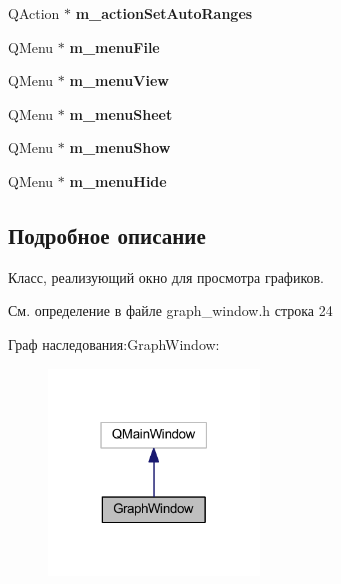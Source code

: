 \begin{DoxyCompactItemize}
\item 
\hypertarget{class_graph_window_add86d9623399b3aaace9c961c2c56d9f}{}\label{class_graph_window_add86d9623399b3aaace9c961c2c56d9f} 
Q\+Action $\ast$ {\bfseries m\+\_\+action\+Set\+Auto\+Ranges}
\item 
\hypertarget{class_graph_window_a2cfe856a0c10dfffb05e4a568d135feb}{}\label{class_graph_window_a2cfe856a0c10dfffb05e4a568d135feb} 
Q\+Menu $\ast$ {\bfseries m\+\_\+menu\+File}
\item 
\hypertarget{class_graph_window_a3e2ffe57452e156a0d62fb82da8ed868}{}\label{class_graph_window_a3e2ffe57452e156a0d62fb82da8ed868} 
Q\+Menu $\ast$ {\bfseries m\+\_\+menu\+View}
\item 
\hypertarget{class_graph_window_ae3c17a4c2fc6e3f935dc3b3f7cc89974}{}\label{class_graph_window_ae3c17a4c2fc6e3f935dc3b3f7cc89974} 
Q\+Menu $\ast$ {\bfseries m\+\_\+menu\+Sheet}
\item 
\hypertarget{class_graph_window_a4078c2f892ffb57912412fb0c38af5ba}{}\label{class_graph_window_a4078c2f892ffb57912412fb0c38af5ba} 
Q\+Menu $\ast$ {\bfseries m\+\_\+menu\+Show}
\item 
\hypertarget{class_graph_window_a2df057f6b70c12d9190a456a7f62b9c4}{}\label{class_graph_window_a2df057f6b70c12d9190a456a7f62b9c4} 
Q\+Menu $\ast$ {\bfseries m\+\_\+menu\+Hide}
\end{DoxyCompactItemize}


\subsection{Подробное описание}
Класс, реализующий окно для просмотра графиков. 

См. определение в файле graph\+\_\+window.\+h строка 24



Граф наследования\+:Graph\+Window\+:
\nopagebreak
\begin{figure}[H]
\begin{center}
\leavevmode
\includegraphics[width=159pt]{class_graph_window__inherit__graph}
\end{center}
\end{figure}


